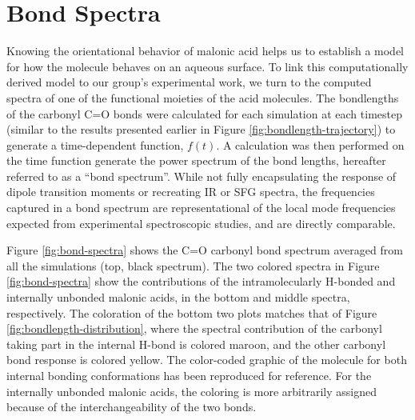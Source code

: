 \section {Bond Spectra}

Knowing the orientational behavior of malonic acid helps us to establish a model for how the molecule behaves on an aqueous surface. To link this computationally derived model to our group's experimental work, we turn to the computed spectra of one of the functional moieties of the acid molecules. The bondlengths of the carbonyl C=O bonds were calculated for each simulation at each timestep (similar to the results presented earlier in Figure \ref{fig:bondlength-trajectory}) to generate a time-dependent function, $f(t)$. A calculation was then performed on the time function generate the power spectrum of the bond lengths, hereafter referred to as a ``bond spectrum''. While not fully encapsulating the response of dipole transition moments or recreating IR or SFG spectra, the frequencies captured in a bond spectrum are representational of the local mode frequencies expected from experimental spectroscopic studies, and are directly comparable.

Figure \ref{fig:bond-spectra} shows the C=O carbonyl bond spectrum averaged from all the simulations (top, black spectrum). The two colored spectra in Figure \ref{fig:bond-spectra} show the contributions of the intramolecularly H-bonded and internally unbonded malonic acids, in the bottom and middle spectra, respectively. The coloration of the bottom two plots matches that of Figure \ref{fig:bondlength-distribution}, where the spectral contribution of the carbonyl taking part in the internal H-bond is colored maroon, and the other carbonyl bond response is colored yellow. The color-coded graphic of the molecule for both internal bonding conformations has been reproduced for reference. For the internally unbonded malonic acids, the coloring is more arbitrarily assigned because of the interchangeability of the two bonds.

